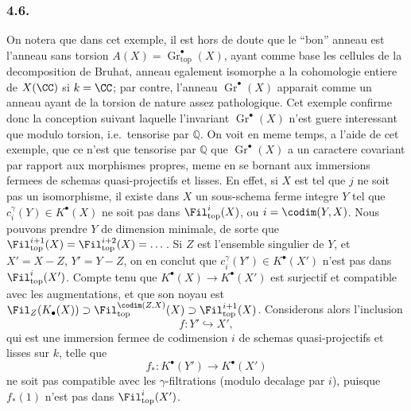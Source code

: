 \subsubsection*{4.6.}
On notera que dans cet exemple, il est hors de doute que le ``bon'' anneau est l'anneau sans torsion $A(X) = \operatorname{Gr}_{\mathrm{top}}^{\bullet}(X)$, ayant comme base les cellules de la decomposition de Bruhat, anneau egalement isomorphe a la cohomologie entiere de $X(\CC)$ si $k = \CC$; par contre, l'anneau $\operatorname{Gr}^{\bullet}(X)$ apparait comme un anneau ayant de la torsion de nature assez pathologique. Cet exemple confirme donc la conception suivant laquelle l'invariant $\operatorname{Gr}^{\bullet}(X)$ n'est guere interessant que modulo torsion, i.e.\ tensorise par $\mathbb{Q}$. On voit en meme temps, a l'aide de cet exemple, que ce n'est que tensorise par $\mathbb{Q}$ que $\operatorname{Gr}^{\bullet}(X)$ a un caractere covariant par rapport aux morphismes propres, meme en se bornant aux immersions fermees de schemas quasi-projectifs et lisses. En effet, si $X$ est tel que $j$ ne soit pas un isomorphisme, il existe dans $X$ un sous-schema ferme integre $Y$ tel que $c_i^{\gamma}(Y) \in K^{\bullet}(X)$ ne soit pas dans $\Fil_{\mathrm{top}}^{i}(X)$, ou $i = \codim(Y, X)$. Nous pouvons prendre $Y$ de dimension minimale, de sorte que $\Fil_{\mathrm{top}}^{i+1}(X) = \Fil_{\mathrm{top}}^{i+2}(X) = \dots$. Si $Z$ est l'ensemble singulier de $Y$, et $X' = X - Z$, $Y' = Y - Z$, on en conclut que $c_i^{\gamma}(Y') \in K^{\bullet}(X')$ n'est pas dans $\Fil_{\mathrm{top}}^{i}(X')$. Compte tenu que $K^{\bullet}(X) \to K^{\bullet}(X')$ est surjectif et compatible avec les augmentations, et que son noyau est $\Fil_Z(K_{\bullet}(X)) \supset \Fil_{\mathrm{top}}^{\codim(Z,X)}(X) \supset \Fil_{\mathrm{top}}^{i+1}(X)$. Considerons alors l'inclusion
\[
f : Y' \hookrightarrow X',
\]
qui est une immersion fermee de codimension $i$ de schemas quasi-projectifs et lisses sur $k$, telle que
\[
f_{*} : K^{\bullet}(Y') \longrightarrow K^{\bullet}(X')
\]
ne soit pas compatible avec les $\gamma$-filtrations (modulo decalage par $i$), puisque $f_{*}(1)$ n'est pas dans $\Fil_{\mathrm{top}}^{i}(X')$.

